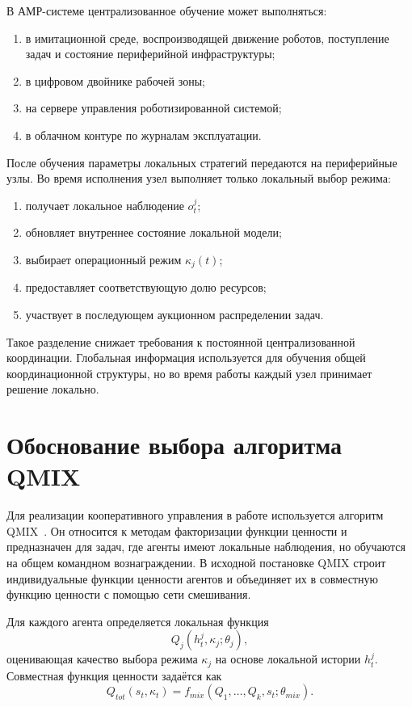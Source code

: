 В АМР-системе централизованное обучение может выполняться:
\begin{enumerate}
    \item в имитационной среде, воспроизводящей движение роботов, поступление задач и состояние периферийной инфраструктуры;
    \item в цифровом двойнике рабочей зоны;
    \item на сервере управления роботизированной системой;
    \item в облачном контуре по журналам эксплуатации.
\end{enumerate}
После обучения параметры локальных стратегий передаются на периферийные узлы. Во время исполнения узел выполняет только локальный выбор режима:
\begin{enumerate}
    \item получает локальное наблюдение $o^j_t$;
    \item обновляет внутреннее состояние локальной модели;
    \item выбирает операционный режим $\kappa_j(t)$;
    \item предоставляет соответствующую долю ресурсов;
    \item участвует в последующем аукционном распределении задач.
\end{enumerate}

Такое разделение снижает требования к постоянной централизованной координации. Глобальная информация используется для обучения общей координационной структуры, но во время работы каждый узел принимает решение локально.

\section{Обоснование выбора алгоритма QMIX}

Для реализации кооперативного управления в работе используется алгоритм QMIX~\cite{Rashid2018QMIX}. Он относится к методам факторизации функции ценности и предназначен для задач, где агенты имеют локальные наблюдения, но обучаются на общем командном вознаграждении. В исходной постановке QMIX строит индивидуальные функции ценности агентов и объединяет их в совместную функцию ценности с помощью сети смешивания.

Для каждого агента определяется локальная функция
\begin{equation}
    Q_j(h^j_t,\kappa_j;\theta_j),
    \label{eq:ch4_local_q}
\end{equation}
оценивающая качество выбора режима $\kappa_j$ на основе локальной истории $h^j_t$. Совместная функция ценности задаётся как
\begin{equation}
    Q_{tot}(s_t,\kappa_t)
    =
    f_{mix}
    \left(
        Q_1,\ldots,Q_k,s_t;\theta_{mix}
    \right).
    \label{eq:ch4_qtot}
\end{equation}

